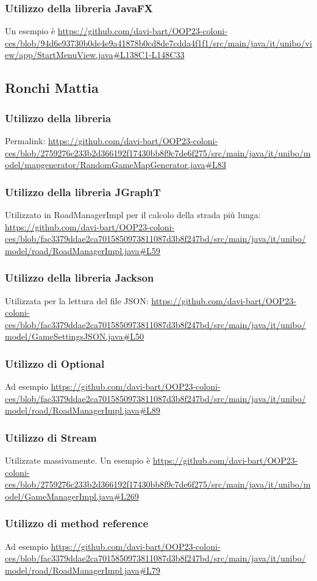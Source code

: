 \documentclass[a4paper,12pt]{report}
\begin{document}
\subsubsection{Utilizzo della libreria JavaFX}
Un esempio \`e \url{https://github.com/davi-bart/OOP23-coloni-ces/blob/94d6e93730b0de4e9a41878b0cd8de7cdda4f1f1/src/main/java/it/unibo/view/app/StartMenuView.java#L138C1-L148C33}
\subsection{Ronchi Mattia}
\subsubsection{Utilizzo della libreria}
Permalink: \url{https://github.com/davi-bart/OOP23-coloni-ces/blob/2759276c233b2d366192f17430bb8f9c7de6f275/src/main/java/it/unibo/model/mapgenerator/RandomGameMapGenerator.java#L83}
\subsubsection{Utilizzo della libreria JGraphT}
Utilizzato in RoadManagerImpl per il calcolo della strada più lunga: \url{https://github.com/davi-bart/OOP23-coloni-ces/blob/fac3379ddae2ca7015850973811087d3b8f247bd/src/main/java/it/unibo/model/road/RoadManagerImpl.java#L59}
\subsubsection{Utilizzo della libreria Jackson}
Utilizzata per la lettura del file JSON: \url{https://github.com/davi-bart/OOP23-coloni-ces/blob/fac3379ddae2ca7015850973811087d3b8f247bd/src/main/java/it/unibo/model/GameSettingsJSON.java#L50}
\subsubsection{Utilizzo di Optional}
Ad esempio \url{https://github.com/davi-bart/OOP23-coloni-ces/blob/fac3379ddae2ca7015850973811087d3b8f247bd/src/main/java/it/unibo/model/road/RoadManagerImpl.java#L89}
\subsubsection{Utilizzo di Stream}
Utilizzate massivamente. Un esempio è \url{https://github.com/davi-bart/OOP23-coloni-ces/blob/2759276c233b2d366192f17430bb8f9c7de6f275/src/main/java/it/unibo/model/GameManagerImpl.java#L269}
\subsubsection{Utilizzo di method reference}
Ad esempio \url{https://github.com/davi-bart/OOP23-coloni-ces/blob/fac3379ddae2ca7015850973811087d3b8f247bd/src/main/java/it/unibo/model/road/RoadManagerImpl.java#L79}
\end{document}
